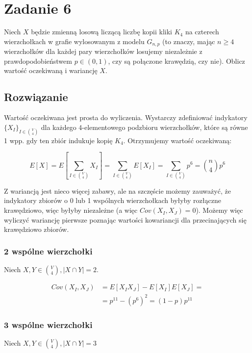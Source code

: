 \section{Zadanie 6}

Niech \(X\) będzie zmienną losową liczącą liczbę kopii kliki \(K_4\) na czterech wierzchołkach w grafie wylosowanym z modelu \(G_{n,p}\) (to znaczy, mając \(n \geq 4\) wierzchołków dla każdej pary wierzchołków losujemy niezależnie z prawdopodobieństwem \(p \in (0, 1)\), czy są połączone krawędzią, czy nie). Oblicz wartość oczekiwaną i wariancję \(X\).

\subsection*{Rozwiązanie}

Wartość oczekiwana jest prosta do wyliczenia. Wystarczy zdefiniować indykatory \(\{X_I\}_{I \in \binom{V}{4}}\) dla każdego 4-elementowego podzbioru wierzchołków, które są równe 1 wpp. gdy ten zbiór indukuje kopię \(K_4\). Otrzymujemy wartość oczekiwaną:

\[
	E[X] = E[\sum_{I \in \binom{V}{4}}X_I] = \sum_{I \in \binom V 4}E[X_I] = \sum_{I \in \binom V 4}p^6 = \binom{n}{4}p^6
\]

Z wariancją jest nieco więcej zabawy, ale na szczęście możemy zauważyć, że indykatory zbiorów o 0 lub 1 wspólnych wierzchołkach byłyby rozłączne krawędziowo, więc byłyby niezależne (a więc \(Cov(X_I, X_J) = 0\)). Możemy więc wyliczyć wariancję pierwsze poznając wartości kowariancji dla przecinających się krawędziowo zbiorów.

\subsubsection*{2 wspólne wierzchołki}

Niech \(X, Y \in \binom{V}{4}, |X \cap Y| = 2\).

\begin{align*}
	Cov(X_I, X_J) & = E[X_IX_J] - E[X_I]E[X_J] =       \\
	              & = p^{11} - (p^{6})^2 = (1-p)p^{11}
\end{align*}

\subsubsection*{3 wspólne wierzchołki}

Niech \(X, Y \in \binom{V}{4}, |X \cap Y| = 3\)

